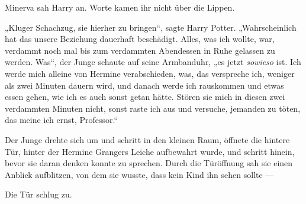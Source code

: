 
Minerva sah Harry an. Worte kamen ihr nicht über die Lippen.

„Kluger Schachzug, sie hierher zu bringen“, sagte Harry Potter.
„Wahrscheinlich hat das unsere Beziehung dauerhaft beschädigt. Alles, was ich wollte, war, verdammt noch mal bis zum verdammten Abendessen in Ruhe gelassen zu werden. Was“, der Junge schaute auf seine Armbanduhr, „es jetzt \emph{sowieso} ist. Ich werde mich alleine von Hermine verabschieden, was, das verspreche ich, weniger als zwei Minuten dauern wird, und danach werde ich rauskommen und etwas essen gehen, wie ich es auch sonst getan hätte. Stören sie mich in diesen zwei verdammten Minuten nicht, sonst raste ich aus und versuche, jemanden zu töten, das meine ich ernst, Professor.“

Der Junge drehte sich um und schritt in den kleinen Raum, öffnete die hintere Tür, hinter der Hermine Grangers Leiche aufbewahrt wurde, und schritt hinein, bevor sie daran denken konnte zu sprechen. Durch die Türöffnung sah sie einen Anblick aufblitzen, von dem sie wusste, dass kein Kind ihn sehen sollte —

Die Tür schlug zu.

